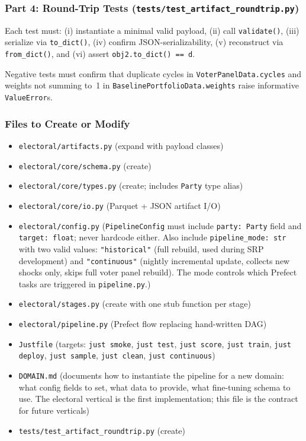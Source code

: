 \documentclass[11pt]{article}
\begin{document}
\subsubsection*{Part 4: Round-Trip Tests (\texttt{tests/test\_artifact\_roundtrip.py})}

Each test must: (i) instantiate a minimal valid payload, (ii) call \texttt{validate()},
(iii) serialize via \texttt{to\_dict()}, (iv) confirm JSON-serializability, (v) reconstruct
via \texttt{from\_dict()}, and (vi) assert \texttt{obj2.to\_dict() == d}.

\medskip
Negative tests must confirm that duplicate cycles in \texttt{VoterPanelData.cycles} and
weights not summing to~1 in \texttt{BaselinePortfolioData.weights} raise informative
\texttt{ValueError}s.

\subsubsection*{Files to Create or Modify}
\begin{itemize}[leftmargin=1.6em, itemsep=2pt]
  \item \texttt{electoral/artifacts.py} (expand with payload classes)
  \item \texttt{electoral/core/schema.py} (create)
  \item \texttt{electoral/core/types.py} (create; includes \texttt{Party} type alias)
  \item \texttt{electoral/core/io.py} (Parquet + JSON artifact I/O)
  \item \texttt{electoral/config.py} (\texttt{PipelineConfig} must include
        \texttt{party: Party} field and \texttt{target: float}; never hardcode
        either. Also include \texttt{pipeline\_mode: str} with two valid values:
        \texttt{"historical"} (full rebuild, used during SRP development) and
        \texttt{"continuous"} (nightly incremental update, collects new shocks
        only, skips full voter panel rebuild). The mode controls which Prefect
        tasks are triggered in \texttt{pipeline.py}.)
  \item \texttt{electoral/stages.py} (create with one stub function per stage)
  \item \texttt{electoral/pipeline.py} (Prefect flow replacing hand-written DAG)
  \item \texttt{Justfile} (targets: \texttt{just smoke}, \texttt{just test},
        \texttt{just score}, \texttt{just train}, \texttt{just deploy},
        \texttt{just sample}, \texttt{just clean}, \texttt{just continuous})
  \item \texttt{DOMAIN.md} (documents how to instantiate the pipeline for a new domain:
        what config fields to set, what data to provide, what fine-tuning schema to use.
        The electoral vertical is the first implementation; this file is the contract
        for future verticals)
  \item \texttt{tests/test\_artifact\_roundtrip.py} (create)
\end{itemize}
\end{document}

